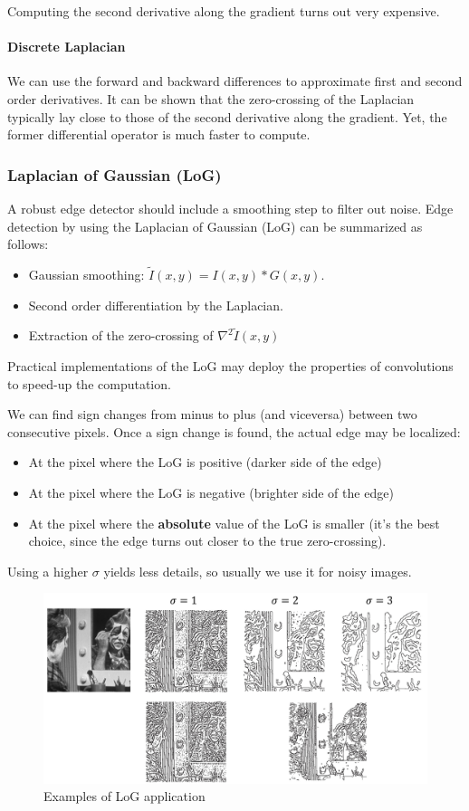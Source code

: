 \documentclass{article}
\begin{document}
Computing the second derivative along the gradient turns out very expensive.

\paragraph{Discrete Laplacian}
We can use the forward and backward differences to approximate first and second order derivatives.
It can be shown that the zero-crossing of the Laplacian typically lay close to those of the second derivative along the gradient.
Yet, the former differential operator is much faster to compute.

\subsubsection{Laplacian of Gaussian (LoG)}
A robust edge detector should include a smoothing step to filter out noise.
Edge detection by using the Laplacian of Gaussian (LoG) can be summarized as follows:
\begin{itemize}
  \item Gaussian smoothing: $\tilde{I}(x,y) = I(x,y) * G(x,y)$.
  \item Second order differentiation by the Laplacian.
  \item Extraction of the zero-crossing of $\nabla^2 \tilde{I}(x,y)$
\end{itemize}

Practical implementations of the LoG may deploy the properties of convolutions to speed-up the computation.

We can find sign changes from minus to plus (and viceversa) between two consecutive pixels.
Once a sign change is found, the actual edge may be localized:
\begin{itemize}
  \item At the pixel where the LoG is positive (darker side of the edge)
  \item At the pixel where the LoG is negative (brighter side of the edge)
  \item At the pixel where the \textbf{absolute} value of the LoG is smaller (it's the best choice, since the edge turns out closer to the true zero-crossing).
\end{itemize}

Using a higher $\sigma$ yields less details, so usually we use it for noisy images.

\begin{figure}[htbp]
  \centering
  \includegraphics[width=0.7\linewidth]{./img/log_application.jpg}
  \caption{Examples of LoG application}
  \label{fig:log_application}
\end{figure}
\end{document}
